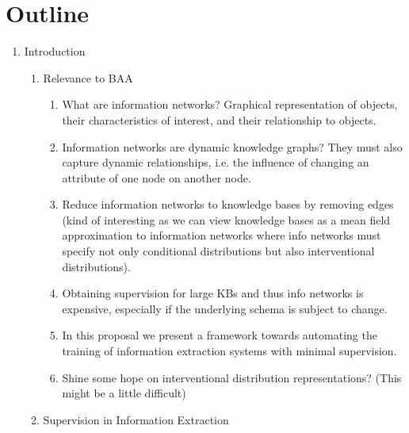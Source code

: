 \documentclass[11pt]{article}
\newcommand\set[1]{\left\{#1\right\}}
\newcommand{\bc}{\mathbf{c}}
\newcommand{\be}{\mathbf{e}}
\newcommand{\br}{\mathbf{r}}
\newcommand{\bt}{\mathbf{t}}
\newcommand{\bv}{\mathbf{v}}
\newcommand{\bx}{\mathbf{x}}
\newcommand{\by}{\mathbf{y}}
\newcommand{\bz}{\mathbf{z}}
\begin{document}
\begin{comment}
For task (\textsc{align}), we have the fully observed summary $\by$,
the unobserved content plan $\bz=\bc$, and all records as conditioning $\bx=\br$.
For task (\textsc{values}), we again have the observed summary $\by$,
but we pretend the values are unobserved $\bz=\set{\bc,\bv}$, and
use the rest of the records as conditioning $\bx=\set{\be,\bt}$.
(TODO: functions)
\end{comment}

\newpage

\section*{Outline}
\begin{enumerate}
\item Introduction
    \begin{enumerate}
    \item Relevance to BAA
        \begin{enumerate}
        \item What are information networks?
            Graphical representation of objects, their characteristics of interest,
            and their relationship to objects.
        \item Information networks are dynamic knowledge graphs?
            They must also capture dynamic relationships, i.e. the influence
            of changing an attribute of one node on another node.
        \item Reduce information networks to knowledge bases by removing edges
            (kind of interesting as we can view knowledge bases as a mean field approximation
            to information networks where info networks must specify not only
            conditional distributions but also interventional distributions).
        \item Obtaining supervision for large KBs and thus info networks is expensive,
            especially if the underlying schema is subject to change.
        \item In this proposal we present a framework towards automating the
            training of information extraction systems with minimal supervision.
        \item Shine some hope on interventional distribution representations?
            (This might be a little difficult)
        \end{enumerate}
    \item Supervision in Information Extraction
        \begin{enumerate}

\end{enumerate}
\end{enumerate}
\end{enumerate}
\end{document}
